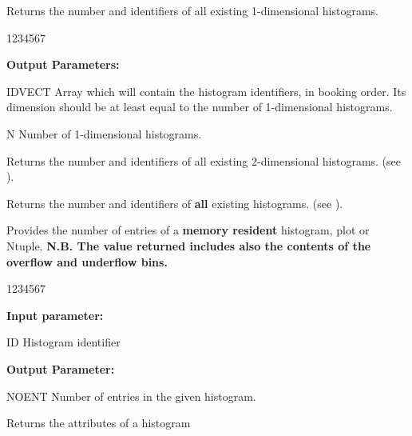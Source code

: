  
\Action
Returns the number and identifiers of all existing 1-dimensional histograms.
 
\begin{DLtt}{1234567}
\item[{\rm\bf Output Parameters:}]
\item[IDVECT] Array which will contain the histogram identifiers, in
     booking order. Its dimension should be at least equal to the number of
     1-dimensional histograms.
\item[N] Number of 1-dimensional histograms.
\end{DLtt}
 
 
\Action
Returns the number and identifiers of all existing 2-dimensional histograms.
(see ).
 
 
\Action
Returns the number and identifiers of {\bf all} existing histograms.
(see ).
 
\label{HNUMENTR}
 
 
\Action
Provides the number of entries of a {\bf memory resident} histogram, 
plot or Ntuple. {\bf N.B. The value returned includes also the contents
of the overflow and underflow bins.}
 
\begin{DLtt}{1234567}
\item[{\rm\bf Input parameter:}]
\item[ID] Histogram identifier
\item[{\rm\bf Output Parameter:}]
\item[NOENT] Number of entries in the given histogram.
\end{DLtt}
 
\label{sec-HKIND}
 
 
\Action
Returns the attributes of a histogram
 
